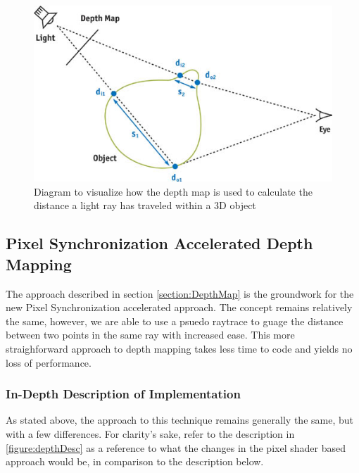 \documentclass[a4paper, 12pt]{article}
\begin{document}
\begin{figure}[h!]
	\centering
	\includegraphics[width=1.0\textwidth]{depthMap.jpg}
	\caption{Diagram to visualize how the depth map is used to calculate the distance a light ray has traveled within a 3D object}
	\label{pic:DepthMap}
\end{figure}



\subsection{Pixel Synchronization Accelerated Depth Mapping}
\label{section:PSDepthMap}

The approach described in section \ref{section:DepthMap} is the groundwork for
the new Pixel Synchronization accelerated approach. The concept remains
relatively the same, however, we are able to use a psuedo raytrace to guage
the distance between two points in the same ray with increased ease. This more
straighforward approach to depth mapping takes less time to code and yields no
loss of performance.

\subsubsection{In-Depth Description of Implementation}

As stated above, the approach to this technique remains generally the same,
but with a few differences. For clarity's sake, refer to the description in
\ref{figure:depthDesc} as a reference to what the changes in the pixel shader
based approach would be, in comparison to the description below.
\end{document}
